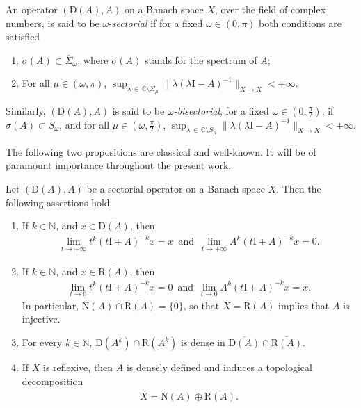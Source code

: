 \documentclass[AHL,Unicode,longabstracts,published]{cedram}
\newcommand{\bbC}{\mathbb{C}}
\newcommand{\bbN}{\mathbb{N}}
\newcommand{\rmD}{\mathrm{D}}
\newcommand{\rmR}{\mathrm{R}}
\newcommand{\rmN}{\mathrm{N}}
\newcommand{\rmI}{\mathrm{I}}
\begin{document}
An operator $(\rmD(A),A)$ on a Banach space $X$, over the field of complex numbers, is said to be $\omega$-\emph{sectorial} if for a fixed $\omega\in (0,\pi)$ both conditions are satisfied
\begin{enumerate}
\item $\sigma(A)\subset \overline{\Sigma}_\omega $, where $\sigma(A)$ stands for the spectrum of $A$;
\item For all $\mu\in(\omega,\pi)$, $\sup_{\lambda\,\in\,\bbC\setminus\overline{\Sigma}_\mu}\| \lambda(\lambda \rmI -A)^{-1}\|_{X\rightarrow X} < +\infty$.
\end{enumerate}
Similarly, $(\rmD(A),A)$ is said to be $\omega$\emph{-bisectorial}, for a fixed $\omega\in (0,\frac{\pi}{2})$, if $\sigma(A)\subset \overline{S}_\omega $, and for all $\mu\in(\omega,\frac{\pi}{2})$, $\sup_{\lambda\,\in\,\bbC\setminus\overline{S}_\mu}\| \lambda(\lambda\rmI - A)^{-1}\|_{X\rightarrow X} < +\infty$.

The following two propositions are classical and well-known. It will be of paramount importance throughout the present work.
\begin{prop}\label{prop:SectOpApproxResolv}
Let $(\rmD(A),A)$ be a sectorial operator on a Banach space $X$. Then the following assertions hold.
\begin{enumerate}
\item If $k\in\bbN $, and $x\in\overline{\rmD(A)}$, then
\begin{align*}
\lim_{t\rightarrow +\infty} t^{k}(t\rmI +A)^{-k}x =x \,\text{ and }\, \lim_{t\rightarrow +\infty} A^{k}(t\rmI +A)^{-k}x =0 .
\end{align*}
\item If $k\in\bbN $, and $x\in\overline{\rmR (A)}$, then
\begin{align*}
\lim_{t\rightarrow 0} t^{k}(t\rmI +A)^{-k}x =0 \,\text{ and }\, \lim_{t\rightarrow 0} A^{k}(t\rmI +A)^{-k}x =x .
\end{align*}
In particular, $\rmN (A)\cap\overline{\rmR (A)}=\{ 0 \}$, so that $X=\overline{\rmR (A)}$ implies that $A$ is injective.
\item For every $k\in\bbN $, $\rmD(A^k)\cap{\rmR (A^k)}$ is dense in $\overline{\rmD(A)}\cap\overline{\rmR (A)}$.
\item If $X$ is reflexive, then $A$ is densely defined and induces a topological decomposition
\begin{align*}
X = \rmN (A)\oplus\overline{\rmR (A)}.
\end{align*}
\end{enumerate}
\end{prop}
\end{document}
